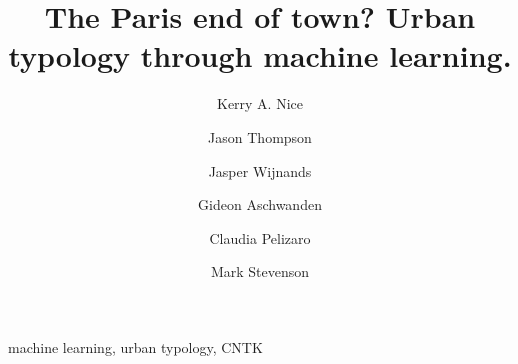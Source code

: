 \documentclass[final,3p,times,authoryear]{elsarticle}
\begin{document}
\begin{frontmatter}



\title{The Paris end of town? Urban typology through machine learning.} 




\author[melb,monash]{Kerry A. Nice}

\author[melb]{Jason Thompson} 
\author[melb]{Jasper Wijnands} 
\author[melb]{Gideon Aschwanden} 
\author[melb]{Claudia Pelizaro} 
\author[melb]{Mark Stevenson} 

\address[melb]{Transport, Health, and Urban Design Hub, Faculty of Architecture, Building, and Planning, University of Melbourne, Victoria 3010, Australia}
\address[monash]{School of Earth, Atmosphere and Environment, Monash University, Clayton, Australia}
\begin{abstract}





\end{abstract}

\begin{keyword}
machine learning, urban typology, CNTK



\end{keyword}

\end{frontmatter}
\end{document}

